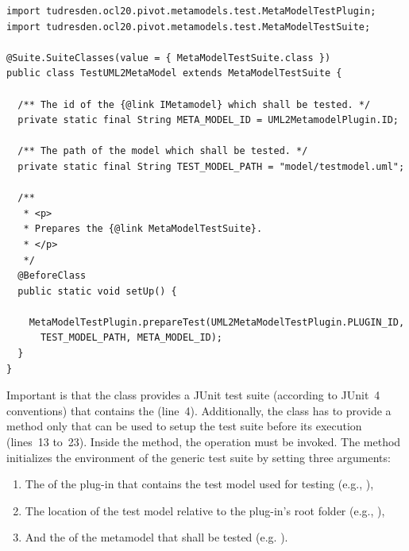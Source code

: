 \lstset{
  language=Java
}
\begin{lstlisting}[caption={An instantiation of the generic metamodel test suite.}, captionpos=b, label=list:metaModelTestSuite:constraints01, float]
import tudresden.ocl20.pivot.metamodels.test.MetaModelTestPlugin;
import tudresden.ocl20.pivot.metamodels.test.MetaModelTestSuite;

@Suite.SuiteClasses(value = { MetaModelTestSuite.class })
public class TestUML2MetaModel extends MetaModelTestSuite {

  /** The id of the {@link IMetamodel} which shall be tested. */
  private static final String META_MODEL_ID = UML2MetamodelPlugin.ID;

  /** The path of the model which shall be tested. */
  private static final String TEST_MODEL_PATH = "model/testmodel.uml";

  /**
   * <p>
   * Prepares the {@link MetaModelTestSuite}.
   * </p>
   */
  @BeforeClass
  public static void setUp() {

    MetaModelTestPlugin.prepareTest(UML2MetaModelTestPlugin.PLUGIN_ID, 
      TEST_MODEL_PATH, META_MODEL_ID);
  }
}
\end{lstlisting}

Important is that the class provides a JUnit test suite (according to JUnit~4
conventions) that contains the  (line~4).
Additionally, the class has to provide a  method only that can be 
used to setup the test suite before its execution (lines~13 to~23). Inside the 
 method, the operation
 must be invoked. 
The method initializes the environment of the generic test suite by setting 
three arguments:

\begin{enumerate}
	\item The  of the plug-in that contains the test model used for 
	  testing (e.g.,
	  ),
	\item The location of the test model relative to the plug-in's root folder 
	  (e.g., ),
	\item And the  of the metamodel that shall be tested (e.g. 
	  ).
\end{enumerate}

